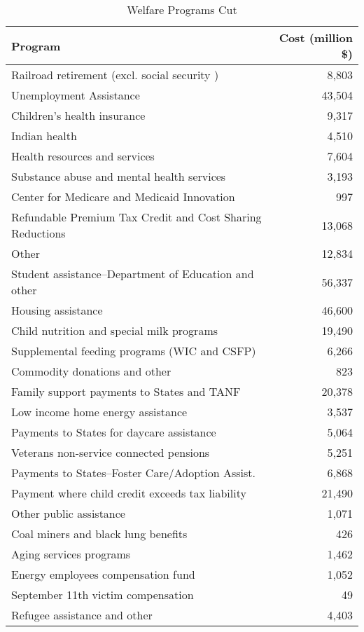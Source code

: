 \documentclass{article}
\begin{document}
\singlespacing
\begin{table}[H]
\caption{Welfare Programs Cut}
\begin{center}
\begin{adjustbox}{max width=\textwidth}
\begin{tabular}{lr}
\toprule
Program & Cost (million \$) \\
\midrule
Railroad retirement (excl. social security ) & 8,803 \\
Unemployment Assistance & 43,504 \\
Children's health insurance & 9,317 \\
Indian health & 4,510 \\
Health resources and services & 7,604 \\
Substance abuse and mental health services & 3,193 \\
Center for Medicare and Medicaid Innovation & 997 \\
Refundable Premium Tax Credit and Cost Sharing Reductions & 13,068 \\
Other & 12,834 \\
Student assistance--Department of Education and other & 56,337 \\
Housing assistance & 46,600 \\
Child nutrition and special milk programs & 19,490 \\
Supplemental feeding programs (WIC and CSFP) & 6,266 \\
Commodity donations and other & 823 \\
Family support payments to States and TANF & 20,378 \\
Low income home energy assistance & 3,537 \\
Payments to States for daycare assistance & 5,064 \\
Veterans non-service connected pensions & 5,251 \\
Payments to States--Foster Care/Adoption Assist. & 6,868 \\
Payment where child credit exceeds tax liability & 21,490 \\
Other public assistance & 1,071 \\
Coal miners and black lung benefits & 426 \\
Aging services programs & 1,462 \\
Energy employees compensation fund & 1,052 \\
September 11th victim compensation & 49 \\
Refugee assistance and other & 4,403 \\

\end{tabular}
\end{adjustbox}
\end{center}
\end{table}
\end{document}
